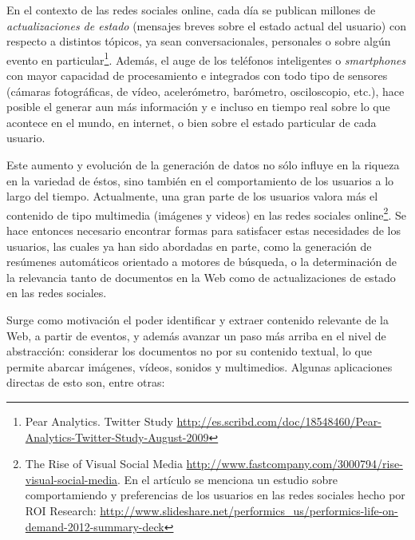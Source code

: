    En el contexto de las redes sociales online, cada día se publican
   millones de \emph{actualizaciones de estado} (mensajes breves sobre el
   estado actual del usuario) con respecto a distintos tópicos, ya
   sean conversacionales, personales o sobre algún evento en
   particular\footnote{Pear Analytics. Twitter Study \href{http://es.scribd.com/doc/18548460/Pear-Analytics-Twitter-Study-August-2009}{http://es.scribd.com/doc/18548460/Pear-Analytics-Twitter-Study-August-2009} }.
   Además, el auge de los teléfonos inteligentes o \emph{smartphones} con mayor
   capacidad de procesamiento e integrados con todo tipo de sensores
   (cámaras fotográficas, de vídeo, acelerómetro, barómetro,
   osciloscopio, etc.), hace posible el generar aun más información y
   e incluso en tiempo real sobre lo que acontece en el mundo, en
   internet, o bien sobre el estado particular de cada usuario.

   Este aumento y evolución de la generación de datos no sólo influye en la
   riqueza en la variedad de éstos, sino también en el
   comportamiento de los usuarios a lo largo del tiempo. Actualmente,
   una gran parte de los usuarios valora más el contenido de tipo
   multimedia (imágenes y videos) en las redes sociales online\footnote{The Rise of Visual Social Media \href{http://www.fastcompany.com/3000794/rise-visual-social-media}{http://www.fastcompany.com/3000794/rise-visual-social-media}. En el   artículo se menciona un estudio sobre comportamiendo y preferencias de los usuarios en las redes sociales hecho por ROI Research: \href{http://www.slideshare.net/performics_us/performics-life-on-demand-2012-summary-deck}{http://www.slideshare.net/performics\_us/performics-life-on-demand-2012-summary-deck} }.
   Se hace entonces necesario encontrar formas para satisfacer estas
   necesidades de los usuarios, las cuales ya han sido
   abordadas en parte, como la generación de
   resúmenes automáticos orientado a motores de búsqueda, o la
   determinación de la relevancia tanto de documentos en la Web como de
   actualizaciones de estado en las redes sociales.

   Surge como motivación el poder identificar y extraer contenido
   relevante de la Web, a partir de eventos, y además avanzar un
   paso más arriba en el nivel de abstracción: considerar los
   documentos no por su contenido textual, lo que permite abarcar
   imágenes, vídeos, sonidos y multimedios. Algunas
   aplicaciones directas de esto son, entre otras:

